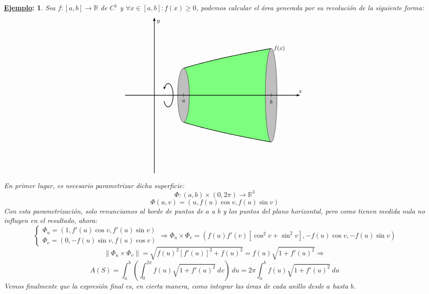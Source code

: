 \documentclass[10pt,a4paper,openright]{book}
\theoremstyle{break}
\newtheorem*{ej}{\underline{Ejemplo}:}
\newcommand{\dif}[1]{\ d#1}
\newcommand{\AxisRotator}[1][rotate=0]{
    \tikz [x=0.25cm,y=0.60cm,line width=.2ex,-stealth,#1] \draw (0,0) arc (-150:150:1 and 1);
    }
\begin{document}
\begin{ej}
Sea $f: \left[ a, b \right] \rightarrow \mathbb{R}$ de $C^1$ y $\forall x \in \left[ a, b \right]: f\left( x \right) \ge 0$, podemos calcular el área generada por su revolución de la siguiente forma:
$$      \begin{tikzpicture}[scale=1,>=latex,x=1.5cm,y=0.8cm]
        \fill[fill=green,opacity=0.5] (1,0) -- plot[domain=1:4] (\x,{sqrt(2*(\x)+1))}) -- (4,0);
        \fill[fill=green,opacity=0.5] (1,0) -- plot[domain=1:4] (\x,{-sqrt(2*(\x)+1))}) -- (4,0);
        \draw[-,thick,domain=1:4,samples=100] plot (\x,{sqrt(2*(\x)+1))}) node[right] {\footnotesize $f(x)$};
        \draw[-,thick,domain=1:4,samples=100] plot (\x,{-sqrt(2*(\x)+1))});
        \draw[fill=gray!50] (4,0) circle [x radius =.2 , y radius =3];
        \draw[fill=gray!50] (1,0) circle [x radius =.2 , y radius =1.732050808];

        \draw[->,thick] (-1,0) -- (5,0) node[above] {\footnotesize $x$};
        \draw[->,thick] (0,-5) -- (0,5) node[below right]{\footnotesize $y$};
        \draw[-] (1,3pt) -- (1,-3pt) node[below] {\footnotesize $a$};
        \draw[-] (4,3pt) -- (4,-3pt) node[below] {\footnotesize $b$};
   \draw (0.5,0) node {\AxisRotator}; 
    \end{tikzpicture}$$
En primer lugar, es necesario parametrizar dicha superficie:
$$\Phi: \left( a, b \right) \times \left( 0, 2\pi \right) \rightarrow \mathbb{R}^3$$
$$\Phi \left( u, v \right) = \left( u, f\left( u \right)\cos v, f\left( u \right)\sin v \right) $$
Con esta parametrización, solo renunciamos al borde de puntos de $a$ a $b$ y los puntos del plano horizontal, pero como tienen medida nula no influyen en el resultado, ahora: 
$$\begin{cases}
\Phi_u = \left( 1, f'\left( u \right) \cos v, f'\left( u \right) \sin v \right) \\ \Phi_v = \left( 0, -f\left( u \right) \sin v, f\left( u \right) \cos v \right)
\end{cases}\Rightarrow \Phi_u \times \Phi_v = \left( f\left( u \right) f'\left( v \right) \left[ \cos^2 v + \sin^2 v \right], -f\left( u \right) \cos v, -f\left( u \right) \sin v \right)$$
$$\lVert \Phi_u \times \Phi_v \rVert = \sqrt{f\left( u \right)^2 \left[ f'\left( u \right) \right]^2 + f\left( u \right)^2} = f\left( u \right) \sqrt{1 + f'\left( u \right)^2} \Rightarrow$$
$$A\left( S \right) = \int_{a}^{b} \left( \int_{0}^{2\pi} f\left( u \right) \sqrt{1 + f'\left( u \right)^2} \dif{v} \right) \dif{u} = 2\pi \int_{a}^{b} f\left( u \right) \sqrt{1 + f'\left( u \right)^2} \dif{u} $$
Vemos finalmente que la expresión final es, en cierta manera, como integrar las áreas de cada anillo desde $a$ hasta $b$.
\end{ej}
\end{document}
